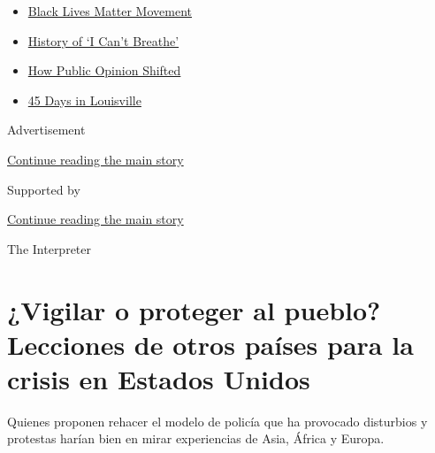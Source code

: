 \begin{itemize}
\tightlist
\item
  \href{https://www.nytimes3xbfgragh.onion/interactive/2020/07/03/us/george-floyd-protests-crowd-size.html?name=styln-george-floyd\&region=TOP_BANNER\&variant=undefined\&block=storyline_menu_recirc\&action=click\&pgtype=Article\&impression_id=81bc50a0-e3a6-11ea-b968-698657e275f6}{Black
  Lives Matter Movement}
\item
  \href{https://www.nytimes3xbfgragh.onion/interactive/2020/06/28/us/i-cant-breathe-police-arrest.html?name=styln-george-floyd\&region=TOP_BANNER\&variant=undefined\&block=storyline_menu_recirc\&action=click\&pgtype=Article\&impression_id=81bc50a1-e3a6-11ea-b968-698657e275f6}{History
  of `I Can't Breathe'}
\item
  \href{https://www.nytimes3xbfgragh.onion/interactive/2020/06/10/upshot/black-lives-matter-attitudes.html?name=styln-george-floyd\&region=TOP_BANNER\&variant=undefined\&block=storyline_menu_recirc\&action=click\&pgtype=Article\&impression_id=81bc77b0-e3a6-11ea-b968-698657e275f6}{How
  Public Opinion Shifted}
\item
  \href{https://www.nytimes3xbfgragh.onion/interactive/2020/07/16/us/black-lives-matter-protests-louisville-breonna-taylor.html?name=styln-george-floyd\&region=TOP_BANNER\&variant=undefined\&block=storyline_menu_recirc\&action=click\&pgtype=Article\&impression_id=81bc77b1-e3a6-11ea-b968-698657e275f6}{45
  Days in Louisville}
\end{itemize}

Advertisement

\protect\hyperlink{after-top}{Continue reading the main story}

Supported by

\protect\hyperlink{after-sponsor}{Continue reading the main story}

The Interpreter

\hypertarget{vigilar-o-proteger-al-pueblo-lecciones-de-otros-pauxedses-para-la-crisis-en-estados-unidos}{%
\section{¿Vigilar o proteger al pueblo? Lecciones de otros países para
la crisis en Estados
Unidos}\label{vigilar-o-proteger-al-pueblo-lecciones-de-otros-pauxedses-para-la-crisis-en-estados-unidos}}

Quienes proponen rehacer el modelo de policía que ha provocado
disturbios y protestas harían bien en mirar experiencias de Asia, África
y Europa.

